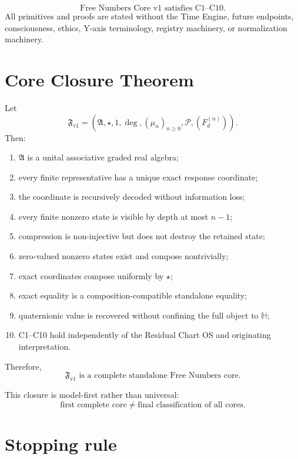 \documentclass[11pt,a4paper]{article}
\newcommand{\Hq}{\mathbb H}
\newcommand{\Fn}{\mathfrak F_{\mathrm{v1}}}
\newcommand{\An}{\mathfrak A}
\newcommand{\st}{\star}
\newcommand{\degf}{\operatorname{deg}}
\begin{document}
\begin{theorembox}
\[
\boxed{
\text{Free Numbers Core v1 satisfies C1--C10.}
}
\]
All primitives and proofs are stated without the Time Engine, future endpoints, consciousness, ethics, Y-axis terminology, registry machinery, or normalization machinery.
\end{theorembox}

\section{Core Closure Theorem}

\begin{theorembox}
Let
\[
\Fn
=
\left(
\An,
\st,
1,
\degf,
(\mu_n)_{n\ge0},
\mathcal P,
(F_d^{(n)})
\right).
\]
Then:
\begin{enumerate}
\item $\An$ is a unital associative graded real algebra;
\item every finite representative has a unique exact response coordinate;
\item the coordinate is recursively decoded without information loss;
\item every finite nonzero state is visible by depth at most $n-1$;
\item compression is non-injective but does not destroy the retained state;
\item zero-valued nonzero states exist and compose nontrivially;
\item exact coordinates compose uniformly by $\st$;
\item exact equality is a composition-compatible standalone equality;
\item quaternionic value is recovered without confining the full object to $\Hq$;
\item C1--C10 hold independently of the Residual Chart OS and originating interpretation.
\end{enumerate}
Therefore,
\[
\boxed{
\Fn
\text{ is a complete standalone Free Numbers core.}
}
\]
\end{theorembox}

This closure is model-first rather than universal:
\[
\boxed{
\text{first complete core}
\ne
\text{final classification of all cores}.
}
\]

\newpage
\section{Stopping rule}
\end{document}
